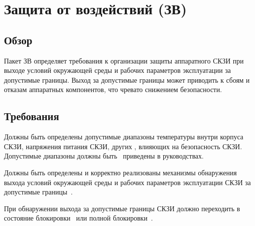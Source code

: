 \section{Защита от воздействий (ЗВ)}\label{EF}

\subsection{Обзор}\label{EF.Intro}

Пакет ЗВ определяет требования к организации защиты аппаратного СКЗИ при выходе 
условий окружающей среды и рабочих параметров эксплуатации за допустимые границы.  
%
Выход за допустимые границы может приводить к сбоям и отказам аппаратных 
компонентов, что чревато снижением безопасности.   

\subsection{Требования}\label{EF.Reqs}

\label{R.EF.Ranges}
Должны быть определены допустимые диапазоны температуры внутри корпуса СКЗИ, 
напряжения питания СКЗИ, других , влияющих на безопасность СКЗИ. Допустимые диапазоны 
должны быть~ приведены в руководствах.

\label{R.EF.Detect}
Должны быть определены и корректно реализованы механизмы 
обнаружения выхода условий окружающей среды и рабочих параметров 
эксплуатации СКЗИ за допустимые границы~. 

\label{R.EF.Lock}
При обнаружении выхода за допустимые границы СКЗИ должно переходить
в состояние блокировки~ или полной 
блокировки~. 
